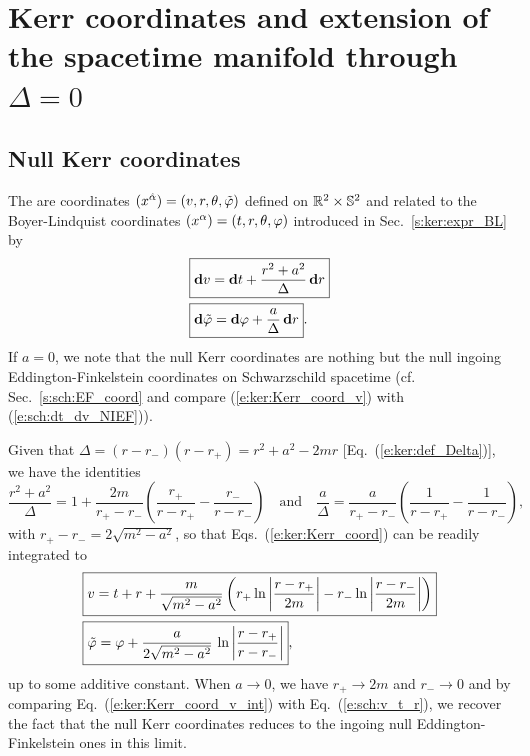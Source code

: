 \section{Kerr coordinates and extension of the spacetime manifold through $\Delta=0$}
\label{s:ker:extension}

\subsection{Null Kerr coordinates} \label{s:ker:Kerr_coord}

The  are coordinates
$(x^{\hat{\alpha}}) = (v,r,\theta,{\tilde\varphi})$ defined on $\mathbb{R}^2\times\mathbb{S}^2$ and related to the Boyer-Lindquist coordinates
$(x^\alpha) = (t,r,\theta,\varphi)$ introduced in Sec.~\ref{s:ker:expr_BL} by
\begin{subequations}
\label{e:ker:Kerr_coord}
\begin{align}
& \fbox{$\displaystyle \mathbf{d} v = \mathbf{d} t + \frac{r^2+a^2}{\Delta} \, \mathbf{d} r$} \label{e:ker:Kerr_coord_v}\\
& \fbox{$\displaystyle \mathbf{d} {\tilde\varphi} = \mathbf{d} \varphi + \frac{a}{\Delta}\, \mathbf{d} r$} . \label{e:ker:Kerr_coord_tph}
\end{align}
\end{subequations}
If $a=0$, we note that the null Kerr coordinates are nothing but the null
ingoing Eddington-Finkelstein
coordinates on Schwarzschild spacetime (cf. Sec.~\ref{s:sch:EF_coord} and compare
(\ref{e:ker:Kerr_coord_v}) with (\ref{e:sch:dt_dv_NIEF})).

Given that $\Delta = (r-r_-)(r-r_+) = r^2+a^2 - 2mr$ [Eq.~(\ref{e:ker:def_Delta})], we have
the identities
\[
    \frac{r^2+a^2}{\Delta} = 1 + \frac{2m}{r_+-r_-} \left( \frac{r_+}{r-r_+}
        - \frac{r_-}{r-r_-} \right) \quad\mbox{and}\quad
     \frac{a}{\Delta} = \frac{a}{r_+-r_-} \left( \frac{1}{r-r_+}
        - \frac{1}{r-r_-} \right) ,
\]
with $r_+-r_- = 2\sqrt{m^2-a^2}$,
so that Eqs.~(\ref{e:ker:Kerr_coord}) can be readily integrated to
\begin{subequations}
\label{e:ker:Kerr_coord_int}
\begin{align}
& \fbox{$\displaystyle v = t + r + \frac{m}{\sqrt{m^2-a^2}} \left(
    r_+ \ln\left| \frac{r-r_+}{2m} \right|
    - r_- \ln\left| \frac{r-r_-}{2m} \right| \right) $}\label{e:ker:Kerr_coord_v_int}\\
& \fbox{$\displaystyle  {\tilde\varphi} = \varphi + \frac{a}{2\sqrt{m^2-a^2}}\, \ln \left|
    \frac{r-r_+}{r-r_-} \right| $} , \label{e:ker:Kerr_coord_tph_int}
\end{align}
\end{subequations}
up to some additive constant.
When $a\rightarrow 0$, we have $r_+\rightarrow 2m$ and $r_-\rightarrow 0$
and by comparing Eq.~(\ref{e:ker:Kerr_coord_v_int}) with Eq.~(\ref{e:sch:v_t_r}), we recover the fact
that the null Kerr coordinates reduces to the ingoing null Eddington-Finkelstein
ones in this limit.

